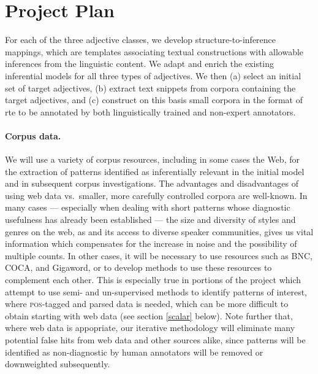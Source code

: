 \documentclass[10pt]{article}
\begin{document}
\section{Project Plan}

For each of the three adjective classes, we develop structure-to-inference mappings, which are templates associating textual constructions with allowable inferences from the linguistic content. We adapt and enrich the existing inferential models for all three types of adjectives. We then (a) select an initial set of target adjectives, (b) extract text snippets from corpora containing the target adjectives, and (c) construct on this basis small corpora in the format of {\sc rte} to be annotated by both linguistically trained and non-expert annotators. 

\paragraph{Corpus data.}
We will use a variety of corpus resources, including in some cases the Web, for the extraction of patterns identified as inferentially relevant in the initial model and in subsequent corpus investigations. 
The advantages and disadvantages of using web data vs.\ smaller, more carefully controlled corpora are well-known.
In many cases --- especially when dealing with short patterns whose diagnostic usefulness has already been established --- the size and diversity of styles and genres on the web, as and its access to diverse speaker communities, gives us vital information which compensates for the increase in noise and the possibility of multiple counts.
In other cases, it will be necessary to use resources such as BNC, COCA, and Gigaword, or to develop methods to use these resources to complement each other.
This is especially true in portions of the project which attempt to use semi- and un-supervised methods to identify patterns of interest, where \textsc{pos}-tagged and parsed data is needed, which can be more difficult to obtain starting with web data (see section \ref{scalar} below).
Note further that, where web data is appopriate, our iterative methodology will eliminate many potential false hits from web data and other sources alike, since patterns will be identified as non-diagnostic by human annotators will be removed or downweighted subsequently.
\end{document}
